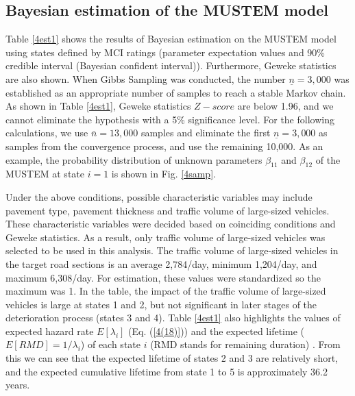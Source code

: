 \documentclass[Journal]{ascelike}
\begin{document}
\subsection{Bayesian estimation of the MUSTEM model}
\label{4sec:markov}
Table \ref{4est1} shows the results of Bayesian estimation on the MUSTEM model using states defined by MCI ratings (parameter expectation values and 90\% credible interval (Bayesian confident interval)). Furthermore, Geweke statistics are also shown. When Gibbs Sampling was conducted, the number $\underline{n}=3,000$ was established as an appropriate number of samples to reach a stable Markov chain. As shown in Table \ref{4est1}, Geweke statistics $Z-score$ are below 1.96, and we cannot eliminate the hypothesis with a 5\% significance level. For the following calculations, we use $\bar{n}=13,000$ samples and eliminate the first $\underline{n}=3,000$ as samples from the convergence process, and use the remaining 10,000. As an example, the probability distribution of unknown parameters $\beta_{11}$ and $\beta_{12}$ of the MUSTEM at state $i=1$ is shown in Fig. \ref{4samp}. 

Under the above conditions, possible characteristic variables may include pavement type, pavement thickness and traffic volume of large-sized vehicles. These characteristic variables were decided based on coinciding conditions and Geweke statistics. As a result, only traffic volume of large-sized vehicles was selected to be used in this analysis. The traffic volume of large-sized vehicles in the target road sections is an average 2,784/day, minimum 1,204/day, and maximum 6,308/day. For estimation, these values were standardized so the maximum was 1. In the table, the impact of the traffic volume of large-sized vehicles is large at states 1 and 2, but not significant in later stages of the deterioration process (states 3 and 4). Table \ref{4est1} also highlights the values of expected hazard rate $E[\lambda_i]$ (Eq. (\ref{4(18)})) and the expected lifetime ($E[RMD]=1/\lambda_i$) of each state $i$ (RMD stands for remaining duration) \citep{kobayashitsuda}. From this we can see that the expected lifetime of states 2 and 3 are relatively short, and the expected cumulative lifetime from state 1 to 5 is approximately 36.2 years. 
\end{document}
